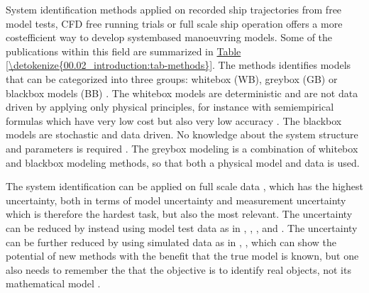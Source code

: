 \documentclass[review]{elsarticle}
\begin{document}
\sphinxAtStartPar
System identification methods applied on recorded ship trajectories from free model tests, CFD free running trials \cite{araki_estimating_2012} or full scale ship operation offers a more cost\sphinxhyphen{}efficient way to develop system\sphinxhyphen{}based manoeuvring models.
Some of the publications within this field are summarized in \hyperref[\detokenize{00.02_introduction:tab-methods}]{Table \ref{\detokenize{00.02_introduction:tab-methods}}}. The methods identifies models that can be categorized into three groups: white\sphinxhyphen{}box (WB), grey\sphinxhyphen{}box (GB) or black\sphinxhyphen{}box models (BB) \cite{miller_ship_2021}. The white\sphinxhyphen{}box models are deterministic and are not data driven by applying only physical principles, for instance with semi\sphinxhyphen{}empirical formulas which have very low cost but also very low accuracy \cite{ittc_maneuvering_2008}. The black\sphinxhyphen{}box models are stochastic and data driven. No knowledge about the system structure and parameters is required \cite{miller_ship_2021}. The grey\sphinxhyphen{}box modeling is a combination of white\sphinxhyphen{}box and black\sphinxhyphen{}box modeling methods, so that both a physical model and data is used.

\sphinxAtStartPar
The system identification can be applied on full scale data \cite{astrom_identification_1976}, \cite{perera_system_2015} which has the highest uncertainty, both in terms of model uncertainty and measurement uncertainty which is therefore the hardest task, but also the most relevant. The uncertainty can be reduced by instead using model test data as in \cite{araki_estimating_2012}, \cite{he_nonparametric_2022}, \cite{xue_identification_2021}, \cite{miller_ship_2021} and \cite{luo_parameter_2016} . The uncertainty can be further reduced by using simulated data as in \cite{shi_identification_2009}, \cite{zhu_parameter_2017}, \cite{wang_parameter_2021} which can show the potential of new methods with the benefit that the true model is known, but one also needs to remember the that the  objective is to identify real objects, not its mathematical model \cite{miller_ship_2021}.
\end{document}
